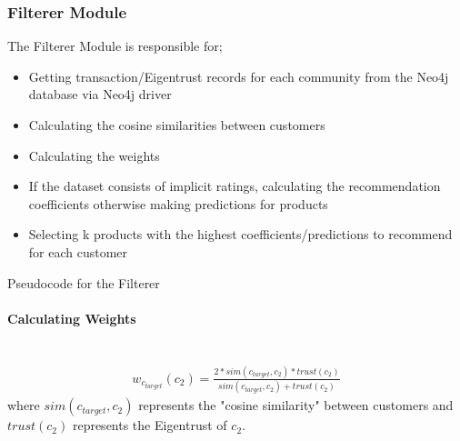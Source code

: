	\subsubsection{Filterer Module} The Filterer Module is responsible for;
	\begin{itemize}
		\item Getting transaction/Eigentrust records for each community from the Neo4j database via Neo4j driver
		\item Calculating the cosine similarities between customers
		\item Calculating the weights
		\item If the dataset consists of implicit ratings, calculating the recommendation coefficients otherwise making predictions for products
		\item Selecting k products with the highest coefficients/predictions to recommend for each customer
	\end{itemize}
	{
		\center
		\begin{algorithm}[H]
			\NoCaptionOfAlgo
			\SetAlgoLined
			\caption{Pseudocode for the Filterer}
		\end{algorithm}
	}

	\paragraph{Calculating Weights} \mbox{}\\
	\begin{equation*} 
	\begin{split}
	w_{c_{target}}(c_{2}) = \frac{2*sim(c_{target},c_{2})*trust(c_{2})}{sim(c_{target},c_{2})+trust(c_{2})}
	\end{split}
	\end{equation*}
	where $sim(c_{target},c_{2})$ represents the "cosine similarity" between customers and $trust(c_{2})$ represents the Eigentrust of $c_{2}$.

